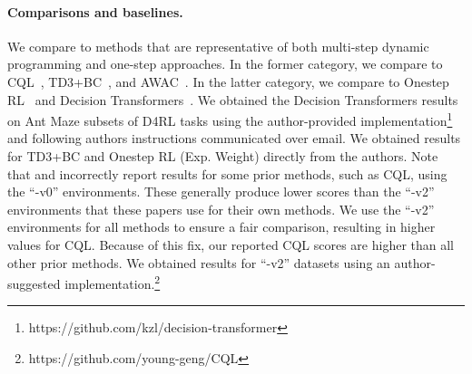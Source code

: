 \documentclass{article} %
\def\ourname{IQL\xspace}
\begin{document}
\paragraph{Comparisons and baselines.} We compare to methods that are representative of both multi-step dynamic programming and one-step approaches. In the former category, we compare to CQL~\citep{kumar2020conservative}, TD3+BC~\citep{fujimoto2021minimalist}, and AWAC~\citep{nair2020awac}. In the latter category, we compare to Onestep RL~\citep{brandfonbrener2021offline} and Decision Transformers~\citep{chen2021decision}. We obtained the Decision Transformers results on Ant Maze subsets of D4RL tasks using the author-provided implementation\footnote{https://github.com/kzl/decision-transformer} and following authors instructions communicated over email. We obtained results for TD3+BC and Onestep RL (Exp. Weight) directly from the authors. Note that \citet{chen2021decision} and \citet{brandfonbrener2021offline}
incorrectly report results for some prior methods, such as CQL, using the ``-v0'' environments. These generally produce lower scores than the ``-v2'' environments that these papers use for their own methods. We use the ``-v2'' environments for all methods to ensure a fair comparison, resulting in higher values for CQL. Because of this fix, our reported CQL scores are higher than all other prior methods. We obtained results for ``-v2'' datasets using an author-suggested implementation.\footnote{https://github.com/young-geng/CQL}
\end{document}
